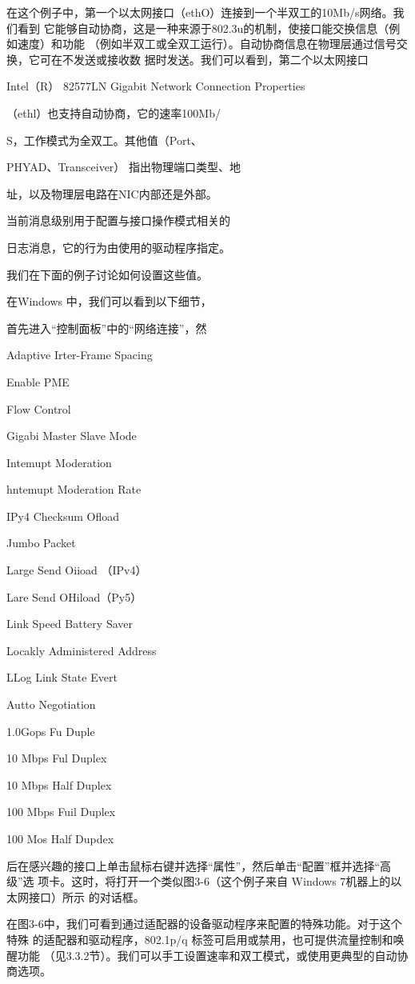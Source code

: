 在这个例子中，第一个以太网接口（ethO）连接到一个半双工的10Mb/s网络。我们看到
它能够自动协商，这是一种来源于802.3u的机制，使接口能交换信息（例如速度）和功能
（例如半双工或全双工运行）。自动协商信息在物理层通过信号交换，它可在不发送或接收数
据时发送。我们可以看到，第二个以太网接口

Intel（R） 82577LN Gigabit Network Connection Properties

（ethl）也支持自动协商，它的速率100Mb/

S，工作模式为全双工。其他值（Port、

PHYAD、Transceiver） 指出物理端口类型、地

址，以及物理层电路在NIC内部还是外部。

当前消息级别用于配置与接口操作模式相关的

日志消息，它的行为由使用的驱动程序指定。

我们在下面的例子讨论如何设置这些值。

在Windows 中，我们可以看到以下细节，

首先进入“控制面板”中的“网络连接”，然

Adaptive Irter-Frame Spacing

Enable PME

Flow Control

Gigabi Master Slave Mode

Intemupt Moderation

hntemupt Moderation Rate

IPy4 Checksum Ofload

Jumbo Packet

Large Send Oiioad （IPv4）

Lare Send OHiload（Py5）

Link Speed Battery Saver

Locakly Administered Address

LLog Link State Evert

Autto Negotiation

1.0Gops Fu Duple

10 Mbps Ful Duplex

10 Mbps Half Duplex

100 Mbps Fuil Duplex

100 Mos Half Dupdex

后在感兴趣的接口上单击鼠标右键并选择“属性”，然后单击“配置”框并选择“高级”选
项卡。这时，将打开一个类似图3-6（这个例子来自 Windows 7机器上的以太网接口）所示
的对话框。

在图3-6中，我们可看到通过适配器的设备驱动程序来配置的特殊功能。对于这个特殊
的适配器和驱动程序，802.1p/q 标签可启用或禁用，也可提供流量控制和唤醒功能
（见3.3.2节）。我们可以手工设置速率和双工模式，或使用更典型的自动协商选项。

